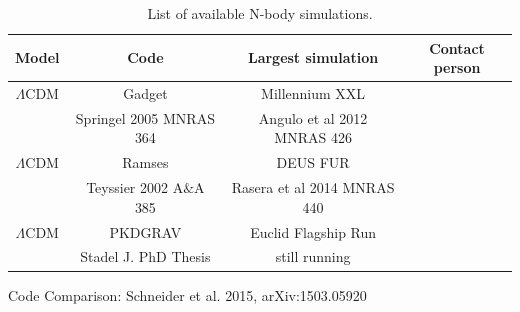 \begin{table}[h!]
\begin{center}
\begin{tabular}{|c|c|c|c|}
\hline
Model        & Code                     & Largest simulation & Contact person\\
\hline
$\Lambda$CDM & Gadget                   & Millennium XXL & \\
             & Springel 2005 MNRAS 364  & Angulo et al 2012 MNRAS 426 &\\
\hline
$\Lambda$CDM & Ramses                   & DEUS FUR &\\
             & Teyssier 2002 A$\&$A 385 & Rasera et al 2014 MNRAS 440 &\\
\hline
$\Lambda$CDM & PKDGRAV                  & Euclid Flagship Run &\\
             & Stadel J. PhD Thesis     & still running &\\
\hline
\end{tabular}
\caption{List of available N-body simulations.}
\end{center}
\end{table}

Code Comparison: Schneider et al. 2015, arXiv:1503.05920



%



